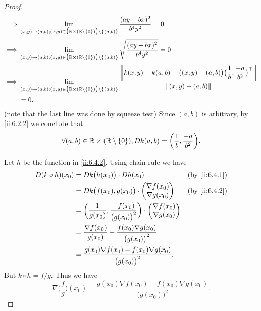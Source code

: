 \begin{proof}
\begin{align*}
    \implies & \lim_{(x, y) \to (a, b) ; (x, y) \in \big(\R \times (\R \setminus \set{0})\big) \setminus \set{(a, b)}} \dfrac{(ay - bx)^2}{b^4 y^2} = 0                                                                                                    \\
    \implies & \lim_{(x, y) \to (a, b) ; (x, y) \in \big(\R \times (\R \setminus \set{0})\big) \setminus \set{(a, b)}} \sqrt{\dfrac{(ay - bx)^2}{b^4 y^2}} = 0                                                                                             \\
    \implies & \lim_{(x, y) \to (a, b) ; (x, y) \in \big(\R \times (\R \setminus \set{0})\big) \setminus \set{(a, b)}} \dfrac{\norm*{k(x, y) - k(a, b) - \big((x, y) - (a, b)\big) \big(\dfrac{1}{b}, \dfrac{-a}{b^2}\big)^\top}}{\norm*{(x, y) - (a, b)}} \\
             & = 0.
  \end{align*}
  (note that the last line was done by squeeze test)
  Since \((a, b)\) is arbitrary, by \cref{ii:6.2.2} we conclude that
  \[
    \forall (a, b) \in \R \times (\R \setminus \set{0}), D k(a, b) = \bigg(\dfrac{1}{b}, \dfrac{-a}{b^2}\bigg).
  \]

  Let \(h\) be the function in \cref{ii:6.4.2}.
  Using chain rule we have
  \begin{align*}
    D (k \circ h)(x_0) & = D k\big(h(x_0)\big) \cdot D h(x_0)                                                       &  & \by{ii:6.4.1} \\
                       & = D k\big(f(x_0), g(x_0)\big) \cdot \begin{pmatrix}
                                                               \nabla f(x_0) \\
                                                               \nabla g(x_0)
                                                             \end{pmatrix}                                        &  & \by{ii:6.4.2}   \\
                       & = \bigg(\dfrac{1}{g(x_0)}, \dfrac{-f(x_0)}{\big(g(x_0)\big)^2}\bigg) \cdot \begin{pmatrix}
                                                                                                      \nabla f(x_0) \\
                                                                                                      \nabla g(x_0)
                                                                                                    \end{pmatrix}                  \\
                       & = \dfrac{\nabla f(x_0)}{g(x_0)} - \dfrac{f(x_0) \nabla g(x_0)}{\big(g(x_0)\big)^2}                         \\
                       & = \dfrac{g(x_0) \nabla f(x_0) - f(x_0) \nabla g(x_0)}{\big(g(x_0)\big)^2}.
  \end{align*}
  But \(k \circ h = f / g\).
  Thus we have
  \[
    \nabla \bigg(\dfrac{f}{g}\bigg)(x_0) = \dfrac{g(x_0) \nabla f(x_0) - f(x_0) \nabla g(x_0)}{\big(g(x_0)\big)^2}.
  \]
\end{proof}

